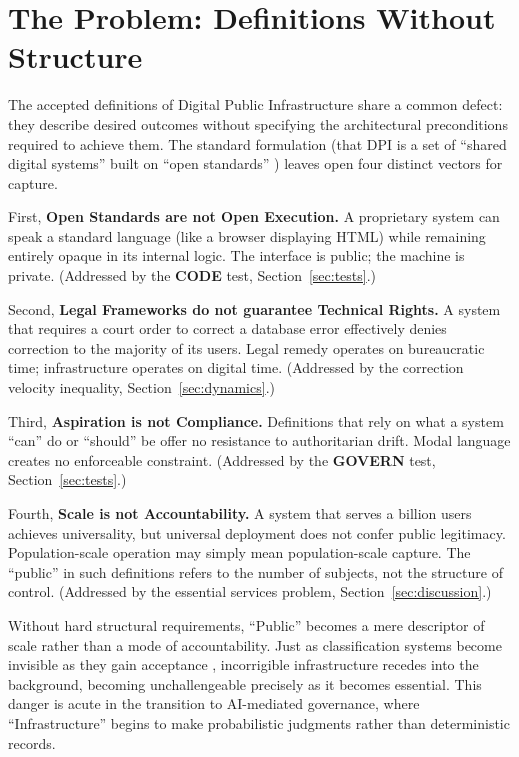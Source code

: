 \section{The Problem: Definitions Without Structure}
\label{sec:problem}

The accepted definitions of Digital Public Infrastructure share a common defect: they describe desired outcomes without specifying the architectural preconditions required to achieve them. The standard formulation (that DPI is a set of ``shared digital systems'' built on ``open standards'' \citep{g20}) leaves open four distinct vectors for capture.

First, \textbf{Open Standards are not Open Execution.} A proprietary system can speak a standard language (like a browser displaying HTML) while remaining entirely opaque in its internal logic. The interface is public; the machine is private. (Addressed by the \textbf{CODE} test, Section~\ref{sec:tests}.)

Second, \textbf{Legal Frameworks do not guarantee Technical Rights.} A system that requires a court order to correct a database error effectively denies correction to the majority of its users. Legal remedy operates on bureaucratic time; infrastructure operates on digital time. (Addressed by the correction velocity inequality, Section~\ref{sec:dynamics}.)

Third, \textbf{Aspiration is not Compliance.} Definitions that rely on what a system ``can'' do or ``should'' be offer no resistance to authoritarian drift. Modal language creates no enforceable constraint. (Addressed by the \textbf{GOVERN} test, Section~\ref{sec:tests}.)

Fourth, \textbf{Scale is not Accountability.} A system that serves a billion users achieves universality, but universal deployment does not confer public legitimacy. Population-scale operation may simply mean population-scale capture. The ``public'' in such definitions refers to the number of subjects, not the structure of control. (Addressed by the essential services problem, Section~\ref{sec:discussion}.)

Without hard structural requirements, ``Public'' becomes a mere descriptor of scale rather than a mode of accountability. Just as classification systems become invisible as they gain acceptance \citep{bowker1999}, incorrigible infrastructure recedes into the background, becoming unchallengeable precisely as it becomes essential. This danger is acute in the transition to AI-mediated governance, where ``Infrastructure'' begins to make probabilistic judgments rather than deterministic records.
